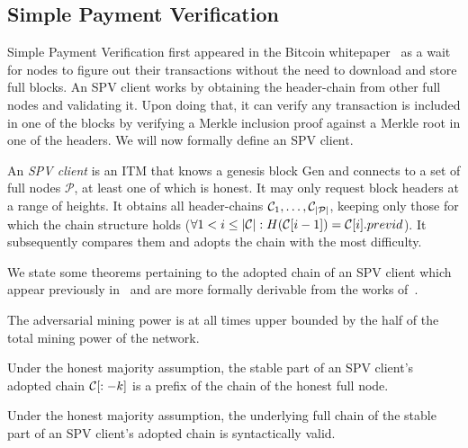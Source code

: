 \subsection{Simple Payment Verification}
Simple Payment Verification first appeared in the Bitcoin whitepaper~\cite{bitcoin} as a wait for nodes to figure out their transactions without the need to download and store full blocks. An SPV client works by obtaining the header-chain from other full nodes and validating it. Upon doing that, it can verify any transaction is included in one of the blocks by verifying a Merkle inclusion proof against a Merkle root in one of the headers. We will now formally define an SPV client.

\begin{definition}
An \emph{SPV client} is an ITM that knows a genesis block \textsf{Gen} and connects to a set of full nodes $\mathcal{P}$, at least one of which is honest. It may only request block headers at a range of heights. It obtains all header-chains $\mathcal{C}_1, \dots, \mathcal{C}_{|\mathcal{P}|}$, keeping only those for which the chain structure holds ($\forall 1 < i \le |\mathcal{C}|: H(\mathcal{C}[i-1]) = \mathcal{C}[i].previd$). It subsequently compares them and adopts the chain with the most difficulty.
\end{definition}

We state some theorems pertaining to the adopted chain of an SPV client which appear previously in~\cite{sok} and are more formally derivable from the works of~\cite{backbone,garay2017bitcoin,pass2017analysis}.

\begin{definition}
The adversarial mining power is at all times upper bounded by the half of the total mining power of the network.
\end{definition}

\begin{theorem}
Under the honest majority assumption, the stable part of an SPV client's adopted chain $\mathcal{C}[:-k]$ is a prefix of the chain of the honest full node.
\end{theorem}

\begin{corollary}
Under the honest majority assumption, the underlying full chain of the stable part of an SPV client's adopted chain is syntactically valid.
\end{corollary}
